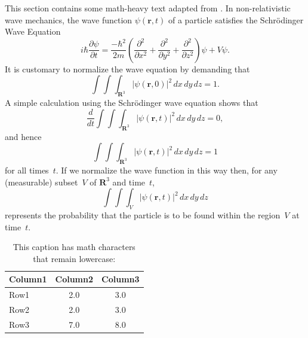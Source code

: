 This section contains some math-heavy text adapted from \iftoggle{usebiblatex}{\textcite{dwilkins1995}}{\citet{dwilkins1995}}. 
In non-relativistic wave mechanics, the wave function $\psi(\mathbf{r},t)$ of a particle satisfies the Schrödinger Wave Equation
%
\begin{equation}
 i\hbar\frac{\partial \psi}{\partial t}
  = \frac{-\hbar^2}{2m} \left(
    \frac{\partial^2}{\partial x^2}
    + \frac{\partial^2}{\partial y^2}
    + \frac{\partial^2}{\partial z^2}
  \right) \psi + V \psi.
\end{equation}
%
It is customary to normalize the wave equation by
demanding that
%
\begin{equation}
\int \!\!\! \int \!\!\! \int_{\textbf{R}^3}
      \left| \psi(\mathbf{r},0) \right|^2\,dx\,dy\,dz = 1.
\end{equation}
%
A simple calculation using the Schr\"{o}dinger wave
equation shows that
%
\begin{equation}
\frac{d}{dt} \int \!\!\! \int \!\!\! \int_{\textbf{R}^3}
      \left| \psi(\mathbf{r},t) \right|^2\,dx\,dy\,dz = 0,
\end{equation}
%
and hence
%
\begin{equation}
\int \!\!\! \int \!\!\! \int_{\textbf{R}^3}
      \left| \psi(\mathbf{r},t) \right|^2\,dx\,dy\,dz = 1
\end{equation} 
%
for all times~$t$. If we normalize the wave function in this
way then, for any (measurable) subset~$V$ of $\textbf{R}^3$
and time~$t$,
%
\begin{equation}
\int \!\!\! \int \!\!\! \int_V
      \left| \psi(\mathbf{r},t) \right|^2\,dx\,dy\,dz
\end{equation} 
%
represents the probability that the particle is to be found
within the region~$V$ at time~$t$. 

\begin{table}[h] %
\caption{This caption has math characters that remain lowercase: \relax{} }
\label{table\arabic{tablecounter}}
\begin{tabu}{l c c} \\ \hline
Column1 & Column2 & Column3 \\ \hline
Row1 & 2.0 & 3.0 \\
Row2 & 2.0 & 3.0 \\
Row3 & 7.0 & 8.0 \\ \hline
\end{tabu}
\end{table}
